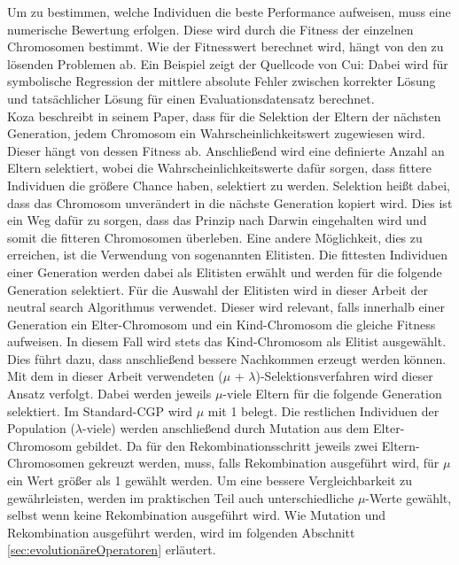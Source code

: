 Um zu bestimmen, welche Individuen die beste Performance aufweisen, muss eine numerische Bewertung erfolgen.
Diese wird durch die Fitness der einzelnen Chromosomen bestimmt. \cite{koza_survey_1995}
Wie der Fitnesswert berechnet wird, hängt von den zu lösenden Problemen ab.
Ein Beispiel zeigt der Quellcode von Cui: Dabei wird für symbolische Regression der mittlere absolute Fehler zwischen korrekter Lösung und tatsächlicher Lösung für einen Evaluationsdatensatz berechnet. \cite{cuihen_cuihencgp_with_crossover_strategies_2024}\\

Koza beschreibt in seinem Paper, dass für die Selektion der Eltern der nächsten Generation, jedem Chromosom ein Wahrscheinlichkeitswert zugewiesen wird.
Dieser hängt von dessen Fitness ab.
Anschließend wird eine definierte Anzahl an Eltern selektiert, wobei die Wahrscheinlichkeitswerte dafür sorgen, dass fittere Individuen die größere Chance haben, selektiert zu werden.
Selektion heißt dabei, dass das Chromosom unverändert in die nächste Generation kopiert wird. \cite{koza_survey_1995}\newline
Dies ist ein Weg dafür zu sorgen, dass das Prinzip nach Darwin eingehalten wird und somit die fitteren Chromosomen \glqq überleben\grqq. 
Eine andere Möglichkeit, dies zu erreichen, ist die Verwendung von sogenannten Elitisten.
Die fittesten Individuen einer Generation werden dabei als Elitisten erwählt und werden für die folgende Generation selektiert. \cite{krawiec_genetic_2013}
Für die Auswahl der Elitisten wird in dieser Arbeit der neutral search Algorithmus verwendet.
Dieser wird relevant, falls innerhalb einer Generation ein Elter-Chromosom und ein Kind-Chromosom die gleiche Fitness aufweisen.
In diesem Fall wird stets das Kind-Chromosom als Elitist ausgewählt.
Dies führt dazu, dass anschließend bessere Nachkommen erzeugt werden können. \cite{mernik_refining_2022}\newline
Mit dem in dieser Arbeit verwendeten ($\mu$ + $\lambda$)-Selektionsverfahren wird dieser Ansatz verfolgt. 
Dabei werden jeweils $\mu$-viele Eltern für die folgende Generation selektiert.
Im Standard-CGP wird $\mu$ mit 1 belegt.
Die restlichen Individuen der Population ($\lambda$-viele) werden anschließend durch Mutation aus dem Elter-Chromosom gebildet. \cite{da_silva_cartesian_2018}
Da für den Rekombinationsschritt jeweils zwei Eltern-Chromosomen gekreuzt werden, muss, falls Rekombination ausgeführt wird, für $\mu$ ein Wert größer als 1 gewählt werden.
Um eine bessere Vergleichbarkeit zu gewährleisten, werden im praktischen Teil auch unterschiedliche $\mu$-Werte gewählt, selbst wenn keine Rekombination ausgeführt wird.\newline
Wie Mutation und Rekombination ausgeführt werden, wird im folgenden Abschnitt \ref{sec:evolutionäreOperatoren} erläutert.


